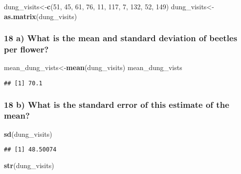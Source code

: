\documentclass[]{article}
\newenvironment{Shaded}{\begin{snugshade}}{\end{snugshade}}
\newcommand{\KeywordTok}[1]{\textcolor[rgb]{0.13,0.29,0.53}{\textbf{#1}}}
\newcommand{\DecValTok}[1]{\textcolor[rgb]{0.00,0.00,0.81}{#1}}
\newcommand{\NormalTok}[1]{#1}
\begin{document}
\begin{Shaded}
\begin{Highlighting}[]
\NormalTok{dung_visits<-}\KeywordTok{c}\NormalTok{(}\DecValTok{51}\NormalTok{, }\DecValTok{45}\NormalTok{, }\DecValTok{61}\NormalTok{, }\DecValTok{76}\NormalTok{, }\DecValTok{11}\NormalTok{, }\DecValTok{117}\NormalTok{, }\DecValTok{7}\NormalTok{, }\DecValTok{132}\NormalTok{, }\DecValTok{52}\NormalTok{, }\DecValTok{149}\NormalTok{)}
\NormalTok{dung_visits<-}\KeywordTok{as.matrix}\NormalTok{(dung_visits)}
\end{Highlighting}
\end{Shaded}

\subsubsection{18 a) What is the mean and standard deviation of beetles
per
flower?}\label{a-what-is-the-mean-and-standard-deviation-of-beetles-per-flower}

\begin{Shaded}
\begin{Highlighting}[]
\NormalTok{mean_dung_vists<-}\KeywordTok{mean}\NormalTok{(dung_visits)}
\NormalTok{mean_dung_vists}
\end{Highlighting}
\end{Shaded}

\begin{verbatim}
## [1] 70.1
\end{verbatim}

\subsubsection{18 b) What is the standard error of this estimate of the
mean?}\label{b-what-is-the-standard-error-of-this-estimate-of-the-mean}

\begin{Shaded}
\begin{Highlighting}[]
\KeywordTok{sd}\NormalTok{(dung_visits)}
\end{Highlighting}
\end{Shaded}

\begin{verbatim}
## [1] 48.50074
\end{verbatim}

\begin{Shaded}
\begin{Highlighting}[]
\KeywordTok{str}\NormalTok{(dung_visits)}
\end{Highlighting}
\end{Shaded}
\end{document}
